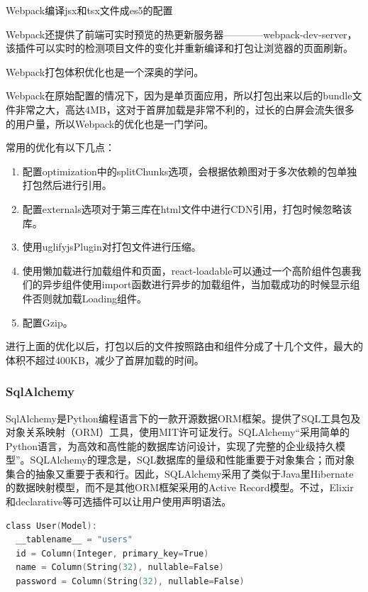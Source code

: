 \begin{center}
	{\small Webpack编译jsx和tsx文件成es5的配置}
\end{center}

Webpack还提供了前端可实时预览的热更新服务器————webpack-dev-server，该插件可以实时的检测项目文件的变化并重新编译和打包让浏览器的页面刷新。

Webpack打包体积优化也是一个深奥的学问。

Webpack在原始配置的情况下，因为是单页面应用，所以打包出来以后的bundle文件非常之大，高达4MB，这对于首屏加载是非常不利的，过长的白屏会流失很多的用户量，所以Webpack的优化也是一门学问。

常用的优化有以下几点：

\begin{enumerate}
	\item 配置optimization中的splitChunks选项，会根据依赖图对于多次依赖的包单独打包然后进行引用。
	\item 配置externals选项对于第三库在html文件中进行CDN引用，打包时候忽略该库。
	\item 使用uglifyjsPlugin对打包文件进行压缩。
	\item 使用懒加载进行加载组件和页面，react-loadable可以通过一个高阶组件包裹我们的异步组件使用import函数进行异步的加载组件，当加载成功的时候显示组件否则就加载Loading组件。
	\item 配置Gzip。
\end{enumerate}

进行上面的优化以后，打包以后的文件按照路由和组件分成了十几个文件，最大的体积不超过400KB，减少了首屏加载的时间。


\subsubsection{SqlAlchemy}
SqlAlchemy是Python编程语言下的一款开源数据ORM框架。提供了SQL工具包及对象关系映射（ORM）工具，使用MIT许可证发行。SQLAlchemy“采用简单的Python语言，为高效和高性能的数据库访问设计，实现了完整的企业级持久模型”。SQLAlchemy的理念是，SQL数据库的量级和性能重要于对象集合；而对象集合的抽象又重要于表和行。因此，SQLAlchemy采用了类似于Java里Hibernate的数据映射模型，而不是其他ORM框架采用的Active Record模型。不过，Elixir和declarative等可选插件可以让用户使用声明语法。

\begin{lstlisting}[language=C]
class User(Model):
  __tablename__ = "users"
  id = Column(Integer, primary_key=True)
  name = Column(String(32), nullable=False)
  password = Column(String(32), nullable=False)
\end{lstlisting}

